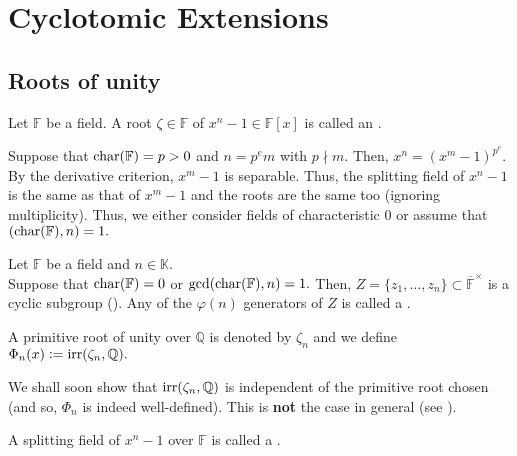 \chapter{Cyclotomic Extensions}

\section{Roots of unity}

\begin{defn}%
    Let $\mathbb{F}$ be a field. A root $\zeta \in \mathbb{F}$ of $x^n - 1 \in \mathbb{F}[x]$ is called an .
\end{defn}

\begin{rem}
    Suppose that $\operatorname{char}(\mathbb{F}) = p > 0$ and $n = p^em$ with $p \nmid m.$ Then, $x^n = (x^m - 1)^{p^e}.$ By the derivative criterion, $x^m - 1$ is separable. Thus, the splitting field of $x^n - 1$ is the same as that of $x^m - 1$ and the roots are the same too (ignoring multiplicity). Thus, we either consider fields of characteristic $0$ or assume that $(\operatorname{char}(\mathbb{F}), n) = 1.$
\end{rem}

\begin{defn}%
    Let $\mathbb{F}$ be a field and $n \in \mathbb{K}.$ \\
    Suppose that $\operatorname{char}(\mathbb{F}) = 0$ or $\gcd(\operatorname{char}(\mathbb{F}), n) = 1.$ Then, $Z = \{z_1, \ldots, z_n\} \subset \overline{\mathbb{F}}^\times$ is a cyclic subgroup (). Any of the $\varphi(n)$ generators of $Z$ is called a .

    A primitive root of unity over $\mathbb{Q}$ is denoted by $\zeta_n$ and we define $\Phi_n(x) \vcentcolon= \operatorname{irr}(\zeta_n, \mathbb{Q}).$ 
\end{defn}

\begin{rem}
    We shall soon show that $\operatorname{irr}(\zeta_n, \mathbb{Q})$ is independent of the primitive root chosen (and so, $\Phi_n$ is indeed well-defined). This is \textbf{not} the case in general (see ).
\end{rem}

\begin{defn}%
    A splitting field of $x^n - 1$ over $\mathbb{F}$ is called a .
\end{defn}

